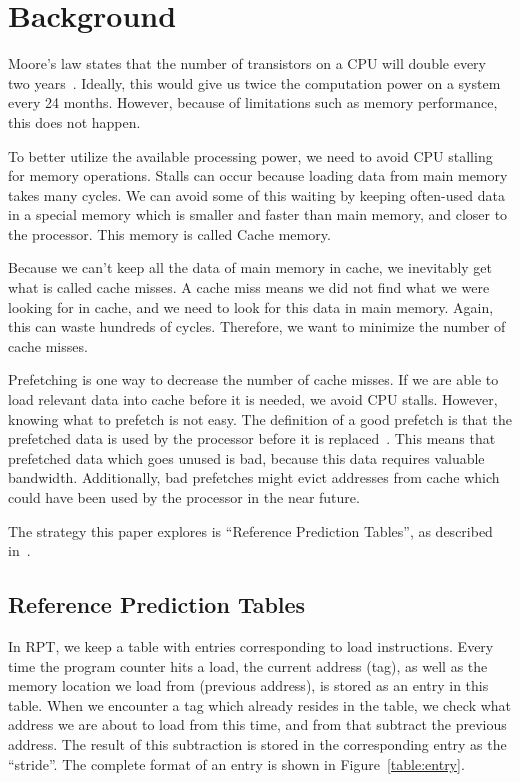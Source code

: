 \section{Background} %


Moore's law states that the number of transistors on a CPU will double
every two years~\cite{moore}. Ideally, this would give us twice the
computation power on a system every 24 months. However, because of
limitations such as memory performance, this does not happen.

To better utilize the available processing power, we need to avoid CPU
stalling for memory operations. Stalls can occur because loading data
from main memory takes many cycles. We can avoid some of this waiting
by keeping often-used data in a special memory which is smaller and
faster than main memory, and closer to the processor. This memory is
called Cache memory.

Because we can't keep all the data of main memory in cache, we
inevitably get what is called cache misses. A cache miss means we did
not find what we were looking for in cache, and we need to look for
this data in main memory. Again, this can waste hundreds of
cycles. Therefore, we want to minimize the number of cache misses.

Prefetching is one way to decrease the number of cache misses. If we
are able to load relevant data into cache before it is needed, we
avoid CPU stalls. However, knowing what to prefetch is not easy. The
definition of a good prefetch is that the prefetched data is used by
the processor before it is
replaced~\cite{srinivasan_davidson_tyson_2004}. This means that
prefetched data which goes unused is bad, because this data requires
valuable bandwidth. Additionally, bad prefetches might evict addresses
from cache which could have been used by the processor in the near
future.

The strategy this paper explores is ``Reference Prediction Tables'', as
described in~\cite{chen_baer_1995}.

\subsection{Reference Prediction Tables}
In RPT, we keep a table with entries corresponding to load
instructions. Every time the program counter hits a load, the current
address (tag), as well as the memory location we load from
(previous address), is stored as an entry in this table. When we encounter a
tag which already resides in the table, we check what address we are
about to load from this time, and from that subtract the previous
address. The result of this subtraction is stored in the corresponding
entry as the ``stride''. The complete format of an entry is shown in
Figure~\ref{table:entry}.

